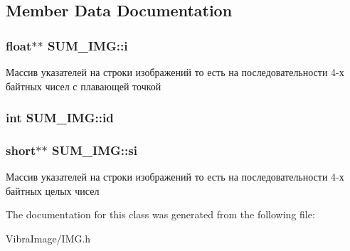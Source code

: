 \subsection{Member Data Documentation}
\hypertarget{class_s_u_m___i_m_g_ac3c585d2cf35e0e9736a19daef633e02}{
\subsubsection[{i}]{\setlength{\rightskip}{0pt plus 5cm}float$\ast$$\ast$ S\+U\+M\+\_\+\+I\+M\+G\+::i}}\label{class_s_u_m___i_m_g_ac3c585d2cf35e0e9736a19daef633e02}


Массив указателей на строки изображений то есть на последовательности 4-\/х байтных чисел с плавающей точкой 

\hypertarget{class_s_u_m___i_m_g_a42cfef194bb1fe08e164e015ad3e6d69}{
\subsubsection[{id}]{\setlength{\rightskip}{0pt plus 5cm}int S\+U\+M\+\_\+\+I\+M\+G\+::id}}\label{class_s_u_m___i_m_g_a42cfef194bb1fe08e164e015ad3e6d69}




\hypertarget{class_s_u_m___i_m_g_a3da86ff936709e9963e6b0a87406afe1}{
\subsubsection[{si}]{\setlength{\rightskip}{0pt plus 5cm}short$\ast$$\ast$ S\+U\+M\+\_\+\+I\+M\+G\+::si}}\label{class_s_u_m___i_m_g_a3da86ff936709e9963e6b0a87406afe1}


Массив указателей на строки изображений то есть на последовательности 4-\/х байтных целых чисел 



The documentation for this class was generated from the following file\+:\begin{DoxyCompactItemize}
\item 
Vibra\+Image/I\+M\+G.\+h\end{DoxyCompactItemize}
